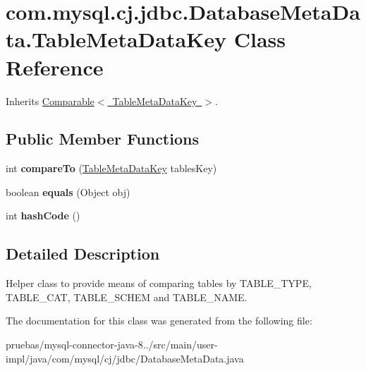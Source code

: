 \hypertarget{classcom_1_1mysql_1_1cj_1_1jdbc_1_1_database_meta_data_1_1_table_meta_data_key}{}\section{com.\+mysql.\+cj.\+jdbc.\+Database\+Meta\+Data.\+Table\+Meta\+Data\+Key Class Reference}
\label{classcom_1_1mysql_1_1cj_1_1jdbc_1_1_database_meta_data_1_1_table_meta_data_key}


Inherits \mbox{\hyperlink{class_comparable}{Comparable$<$ Table\+Meta\+Data\+Key $>$}}.

\subsection*{Public Member Functions}
\begin{DoxyCompactItemize}
\item 
\mbox{\label{classcom_1_1mysql_1_1cj_1_1jdbc_1_1_database_meta_data_1_1_table_meta_data_key_aab0f0a7eea9755850746efb0d1de5cfd}} 
int {\bfseries compare\+To} (\mbox{\hyperlink{classcom_1_1mysql_1_1cj_1_1jdbc_1_1_database_meta_data_1_1_table_meta_data_key}{Table\+Meta\+Data\+Key}} tables\+Key)
\item 
\mbox{\label{classcom_1_1mysql_1_1cj_1_1jdbc_1_1_database_meta_data_1_1_table_meta_data_key_a528b5033f91e8c4c16f86af5d217b474}} 
boolean {\bfseries equals} (Object obj)
\item 
\mbox{\label{classcom_1_1mysql_1_1cj_1_1jdbc_1_1_database_meta_data_1_1_table_meta_data_key_a4191e1d451e0c19fc531c2eb7cf047fb}} 
int {\bfseries hash\+Code} ()
\end{DoxyCompactItemize}


\subsection{Detailed Description}
Helper class to provide means of comparing tables by T\+A\+B\+L\+E\+\_\+\+T\+Y\+PE, T\+A\+B\+L\+E\+\_\+\+C\+AT, T\+A\+B\+L\+E\+\_\+\+S\+C\+H\+EM and T\+A\+B\+L\+E\+\_\+\+N\+A\+ME. 

The documentation for this class was generated from the following file\+:\begin{DoxyCompactItemize}
\item 
pruebas/mysql-\/connector-\/java-\/8../src/main/user-\/impl/java/com/mysql/cj/jdbc/Database\+Meta\+Data.\+java\end{DoxyCompactItemize}
